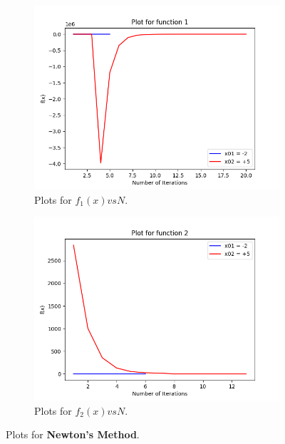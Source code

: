 \documentclass[a4paper, 12pt]{report}
\begin{document}
\begin{figure}[!h]
\centering
\begin{subfigure}{.55\textwidth}
  \centering
  \includegraphics[width=.95\linewidth]{NM1.png}
  \caption{Plots for $f_{1}(x) vs N$.}
\end{subfigure}%
\begin{subfigure}{.55\textwidth}
  \centering
  \includegraphics[width=.95\linewidth]{NM2.png}
  \caption{Plots for $f_{2}(x) vs N$.}
\end{subfigure}
\caption{Plots for \textbf{Newton's Method}.}
\label{fig:Plot2}
\end{figure}
\end{document}
